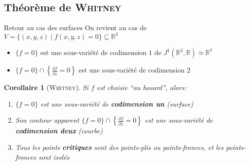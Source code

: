 \documentclass[compress, usepdftitle=false]{beamer}
\newcommand{\R}{\mathbb{R}}
\newtheorem{cor}{Corollaire}
\theoremstyle{definition}
\begin{document}
\subsection{Théorème de \textsc{Whitney}}
\begin{frame}{Retour au cas des surfaces}
    On revient au cas de $V = \{ (x,y,z)\mid f(x,y,z)=0 \} \subseteq \R^3$

    \pause
    \begin{itemize}
        \item $\{ f=0 \}$ est une sous-variété de codimension $1$ de $J^1(\R^3,\R) \simeq \R^7$
        \item $\{ f=0 \}\cap \left\{ \frac{\partial f}{\partial z}=0 \right\}$ est une sous-variété de codimension $2$
    \end{itemize}

    \pause
    \begin{cor}[\textsc{Whitney}]
        Si $f$ est choisie ``au hasard'', alors:
        \begin{enumerate}
            \item $\{f=0\}$ est une sous-variété de \textbf{codimension un} (\alert{surface})
            \item Son contour apparent $\{f=0\}\cap \left\{\frac{\partial f}{\partial z}=0\right\}$ est une sous-variété de \textbf{codimension deux} (\alert{courbe})
            \item Tous les points \textbf{critiques} sont des points-plis ou points-fronces, et les points-fronces sont isolés
        \end{enumerate}
    \end{cor}
\end{frame}
\end{document}
